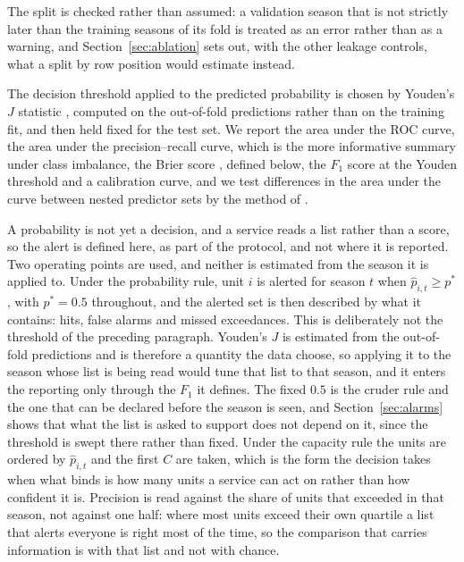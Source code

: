 \documentclass[english,10pt,b5paper]{article}
\begin{document}
The split is checked rather than assumed: a validation season that is not
strictly later than the training seasons of its fold is treated as an error
rather than as a warning, and Section~\ref{sec:ablation} sets out, with the
other leakage controls, what a split by row position would estimate instead.

The decision threshold applied to the predicted probability is chosen by
Youden's $J$ statistic \citep{youden1950index}, computed on the out-of-fold
predictions rather than on the training fit, and then held fixed for the test
set. We report the area under the ROC curve, the area under the
precision--recall curve, which is the more informative summary under class
imbalance, the Brier score \citep{gneiting2007strictly}, defined below, the
$F_1$ score at the Youden threshold and a calibration curve, and we test
differences in the area under the curve between nested predictor sets by the
method of \citet{delong1988comparing}.

A probability is not yet a decision, and a service reads a list rather than a
score, so the alert is defined here, as part of the protocol, and not where it
is reported. Two operating points are used, and neither is estimated from the
season it is applied to. Under the probability rule, unit $i$ is alerted for
season $t$ when $\hat p_{i,t}\ge p^{\ast}$, with $p^{\ast}=0.5$ throughout, and
the alerted set is then described by what it contains: hits, false alarms and
missed exceedances. This is deliberately not the threshold of the preceding
paragraph. Youden's $J$ is estimated from the out-of-fold predictions and is
therefore a quantity the data choose, so applying it to the season whose list is
being read would tune that list to that season, and it enters the reporting only
through the $F_1$ it defines. The fixed $0.5$ is the cruder rule and the one
that can be declared before the season is seen, and Section~\ref{sec:alarms}
shows that what the list is asked to support does not depend on it, since the
threshold is swept there rather than fixed. Under the capacity rule the units
are ordered by $\hat p_{i,t}$ and the first $C$ are taken, which is the form the
decision takes when what binds is how many units a service can act on rather
than how confident it is. Precision is read against the share of units that
exceeded in that season, not against one half: where most units exceed their own
quartile a list that alerts everyone is right most of the time, so the
comparison that carries information is with that list and not with chance.
\end{document}
